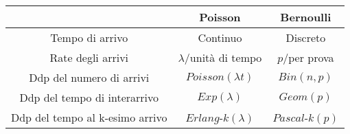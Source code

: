 \documentclass[8pt]{extarticle}
\begin{document}
\begin{multicols*}{3}
\begin{itemize}
                \begin{tabular}{ |c|c|c| } 
                 \hline
                  & Poisson & Bernoulli \\ 
                 \hline
                 Tempo di arrivo & Continuo & Discreto \\ 
                 Rate degli arrivi & $\lambda$/unità di tempo & $p$/per prova \\
                 Ddp del numero di arrivi & $Poisson(\lambda t)$ & $Bin(n,p)$ \\
                 Ddp del tempo di interarrivo & $Exp(\lambda)$ & $Geom(p)$ \\
                 Ddp del tempo al k-esimo arrivo & $Erlang$-$k(\lambda)$ & $Pascal$-$k(p)$ \\
                 \hline
                \end{tabular}
    \end{itemize}


\end{multicols*}
\end{document}

